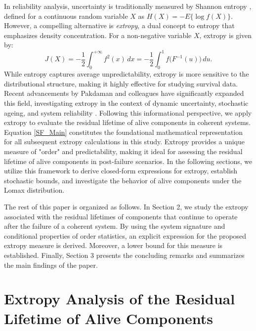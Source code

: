 \documentclass[twoside]{article}
\begin{document}
In reliability analysis, uncertainty is traditionally measured by Shannon entropy \cite{Shannon:1948}, defined for a continuous random variable $X$ as $H(X)=-E\{\log f(X)\}$. However, a compelling alternative is \emph{extropy}, a dual concept to entropy that emphasizes density concentration.
 For a non-negative variable $X$, extropy is given by:
\begin{equation*}\label{eq:extropy_def}
J(X) = -\frac{1}{2}\int_{0}^{+\infty} f^{2}(x)\,dx = -\frac{1}{2}\int_{0}^{1} f\big(F^{-1}(u)\big)\,du.
\end{equation*}
While entropy captures average unpredictability, extropy is more sensitive to the distributional structure, making it highly effective for studying survival data. Recent advancements by Pakdaman and colleagues have significantly expanded this field, investigating extropy in the context of dynamic uncertainty, stochastic ageing, and system reliability \cite{ PakdamanNoughabi:2025b, PakdamanAlizadehNoughabi:2025c, PakdamanNoughabi:2026}. Following this informational perspective, we apply extropy to evaluate the residual lifetime of alive components in coherent systems.
 Equation \eqref{SF_Main} constitutes the foundational mathematical representation for all subsequent extropy calculations in this study. Extropy provides a unique measure of "order" and predictability, making it ideal for assessing the residual lifetime of alive components in post-failure scenarios. In the following sections, we utilize this framework to derive closed-form expressions for extropy, establish stochastic bounds, and investigate the behavior of alive components under the Lomax distribution.
 
 The rest of this paper is organized as follows. In Section 2, we study the extropy associated with the residual lifetimes of components that continue to operate after the failure of a coherent system. By using the system signature and conditional properties of order statistics, an explicit expression for the proposed extropy measure is derived. Moreover, a lower bound for this measure is established. Finally, Section 3 presents the concluding remarks and summarizes the main findings of the paper.

\section{Extropy Analysis of the Residual Lifetime of Alive Components}
\end{document}
